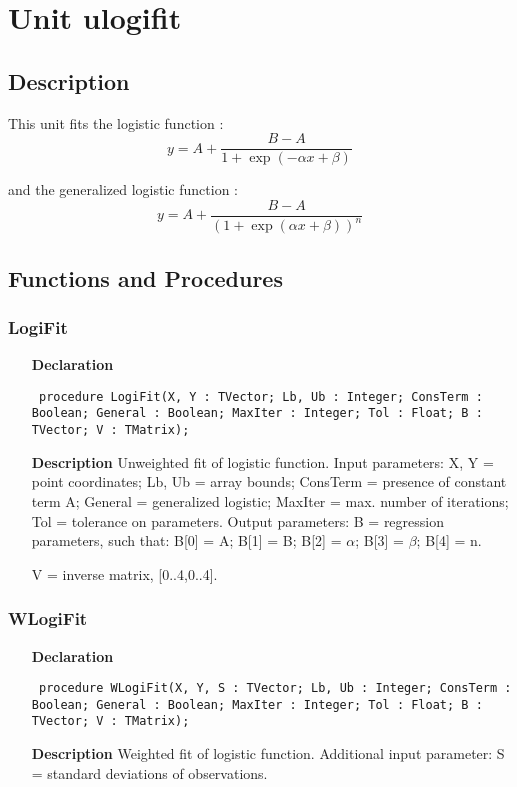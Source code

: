\documentclass[12pt,a4paper,oneside]{report}
\newcommand{\declarationitem}[1]{\textbf{#1}}
\newcommand{\descriptiontitle}[1]{\textbf{#1}}
\newcommand{\code}[1]{\texttt{#1}}
\begin{document}
\section{Unit ulogifit}
\label{ulogifit}
\subsection{Description}
This unit fits the logistic function :
$$
y=A + \frac{B-A}{1+\exp(-\alpha x + \beta)}
$$

and the generalized logistic function :
$$y=A + \frac{B-A}{(1+\exp(\alpha x + \beta))^n}$$
\subsection{Functions and Procedures}
\subsubsection{LogiFit}
\label{ulogifit-LogiFit}
\begin{itemize}\item[\declarationitem{Declaration}\hfill]
	\begin{flushleft}
		\code{
			procedure LogiFit(X, Y : TVector; Lb, Ub : Integer; ConsTerm : Boolean; General : Boolean; MaxIter : Integer; Tol : Float; B : TVector; V : TMatrix);}
		
	\end{flushleft}
	
	\par
	\item[\descriptiontitle{Description}]
	Unweighted fit of logistic function. Input parameters: X, Y = point coordinates; Lb, Ub = array bounds; ConsTerm = presence of constant term A; General = generalized logistic; MaxIter = max. number of iterations; Tol = tolerance on parameters. Output parameters: B = regression parameters, such that: B[0] = A; B[1] = B; B[2] = $\alpha$; B[3] = $\beta$; B[4] = n.
	
	V = inverse matrix, [0..4,0..4].
	
\end{itemize}
\subsubsection{WLogiFit}
\label{ulogifit-WLogiFit}
\begin{itemize}\item[\declarationitem{Declaration}\hfill]
	\begin{flushleft}
		\code{
			procedure WLogiFit(X, Y, S : TVector; Lb, Ub : Integer; ConsTerm : Boolean; General : Boolean; MaxIter : Integer; Tol : Float; B : TVector; V : TMatrix);}
		
	\end{flushleft}
	
	\par
	\item[\descriptiontitle{Description}]
	Weighted fit of logistic function. Additional input parameter: S = standard deviations of observations.
	
\end{itemize}
\end{document}
